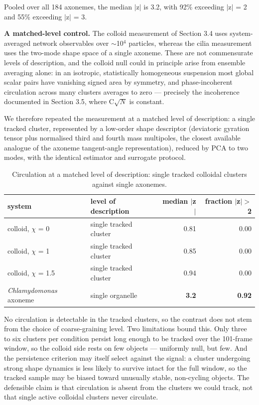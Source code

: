 \documentclass[aps,pre,preprint,superscriptaddress,nofootinbib,longbibliography]{revtex4-2}
\begin{document}
Pooled over all 184 axonemes, the median $|$z$|$ is 3.2, with 92\% exceeding $|$z$|$ = 2 and 55\% exceeding
$|$z$|$ = 3.

\textbf{A matched-level control.} The colloid measurement of Section 3.4 uses system-averaged network observables over $\sim$10$^{4}$ particles, whereas the cilia measurement uses the two-mode shape space of a single axoneme. These are not commensurate levels of description, and the colloid null could in principle arise from ensemble averaging alone: in an isotropic, statistically homogeneous suspension most global scalar pairs have vanishing signed area by symmetry, and phase-incoherent circulation across many clusters averages to zero --- precisely the incoherence documented in Section 3.5, where C$\sqrt{N}$ is constant.

We therefore repeated the measurement at a matched level of description: a single tracked cluster, represented by a low-order shape descriptor (deviatoric gyration tensor plus normalised third and fourth mass multipoles, the closest available analogue of the axoneme tangent-angle representation), reduced by PCA to two modes, with the identical estimator and surrogate protocol.

\begin{table}[htbp]
\caption{Circulation at a matched level of description: single tracked colloidal clusters against single axonemes.}
\label{tab:19}
\begin{ruledtabular}
\begin{tabular}{llrr}
system & level of description & median $|$z$|$ & fraction $|$z$| >$2 \\
\hline
colloid, $\chi$ = 0 & single tracked cluster & 0.81 & 0.00 \\
colloid, $\chi$ = 1 & single tracked cluster & 0.85 & 0.00 \\
colloid, $\chi$ = 1.5 & single tracked cluster & 0.94 & 0.00 \\
\emph{Chlamydomonas} axoneme & single organelle & \textbf{3.2} & \textbf{0.92} \\
\end{tabular}
\end{ruledtabular}
\end{table}

No circulation is detectable in the tracked clusters, so the contrast does not stem from the choice of coarse-graining level. Two limitations bound this. Only three to six clusters per condition persist long enough to be tracked over the 101-frame window, so the colloid side rests on few objects --- uniformly null, but few. And the persistence criterion may itself select against the signal: a cluster undergoing strong shape dynamics is less likely to survive intact for the full window, so the tracked sample may be biased toward unusually stable, non-cycling objects. The defensible claim is that circulation is absent from the clusters we could track, not that single active colloidal clusters never circulate.
\end{document}
